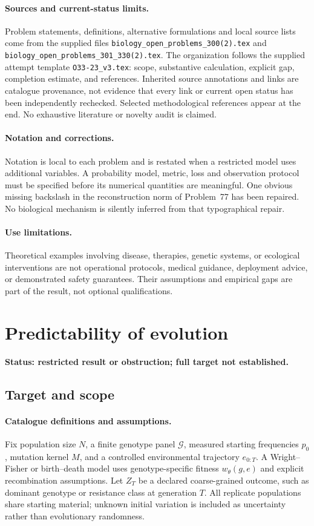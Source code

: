 \documentclass[11pt]{article}
\begin{document}
\paragraph{Sources and current-status limits.}
Problem statements, definitions, alternative formulations and local source lists
come from the supplied files
\texttt{biology\_open\_problems\_300(2).tex} and
\texttt{biology\_open\_problems\_301\_330(2).tex}.
The organization follows the supplied attempt template
\texttt{O33-23\_v3.tex}: scope, substantive calculation, explicit gap,
completion estimate, and references. Inherited source annotations and links are
catalogue provenance, not evidence that every link or current open status has
been independently rechecked. Selected methodological references appear at the
end. No exhaustive literature or novelty audit is claimed.

\paragraph{Notation and corrections.}
Notation is local to each problem and is restated when a restricted model uses
additional variables. A probability model, metric, loss and observation protocol
must be specified before its numerical quantities are meaningful. One obvious
missing backslash in the reconstruction norm of Problem~77 has been repaired.
No biological mechanism is silently inferred from that typographical repair.

\paragraph{Use limitations.}
Theoretical examples involving disease, therapies, genetic systems, or ecological
interventions are not operational protocols, medical guidance, deployment advice,
or demonstrated safety guarantees. Their assumptions and empirical gaps are part
of the result, not optional qualifications.


\section*{Predictability of evolution}
\label{prob:141}
\noindent\textbf{Status: restricted result or obstruction; full target not established.}
\subsection{Target and scope}
\paragraph{Catalogue definitions and assumptions.}
Fix population size $N$, a finite genotype panel $\mathcal G$, measured starting frequencies $p_0$, mutation kernel $M$, and a controlled environmental trajectory $e_{0:T}$. A Wright--Fisher or birth--death model uses genotype-specific fitness $w_\theta(g,e)$ and explicit recombination assumptions. Let $Z_T$ be a declared coarse-grained outcome, such as dominant genotype or resistance class at generation $T$. All replicate populations share starting material; unknown initial variation is included as uncertainty rather than evolutionary randomness.
\end{document}
